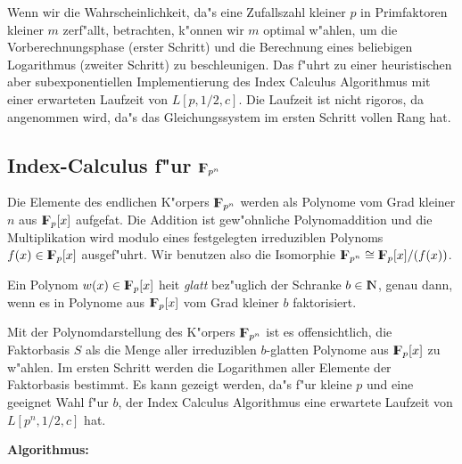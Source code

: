 Wenn wir die Wahrscheinlichkeit, da"s eine Zufallszahl kleiner $p$ in
Primfaktoren kleiner $m$ zerf"allt, betrachten, k"onnen wir $m$ optimal
w"ahlen, um die Vorberechnungsphase (erster Schritt) und die Berechnung
eines beliebigen Logarithmus (zweiter Schritt) zu beschleunigen. Das f"uhrt
zu einer heuristischen aber subexponentiellen Implementierung des 
Index Calculus Algorithmus mit einer erwarteten Laufzeit von
$L[p,1/2,c]$. Die Laufzeit ist nicht rigoros, da angenommen wird, da"s
das Gleichungssystem im ersten Schritt vollen Rang hat.

\subsection{Index-Calculus f"ur $\koerper{p^n}$}

Die Elemente des endlichen K"orpers $\koerper{p^n}$ werden als Polynome vom 
Grad kleiner $n$ aus $\koerper{p}[x]$ aufgefa\3t. Die Addition ist
gew"ohnliche Polynomaddition und die Multiplikation wird modulo eines
festgelegten irreduziblen Polynoms $f(x)\in\koerper{p}[x]$ ausgef"uhrt.
Wir benutzen also die Isomorphie $\koerper{p^n} \cong \koerper{p}[x]/(f(x))$.

\begin{definition}
  Ein Polynom $w(x)\in\koerper{p}[x]$ hei\3t {\em glatt} bez"uglich
  der Schranke $b\in\N$, genau dann, wenn es in Polynome aus 
  $\koerper{p}[x]$ vom Grad kleiner $b$ faktorisiert.
\end{definition}

Mit der Polynomdarstellung des K"orpers $\koerper{p^n}$ ist es offensichtlich,
die Faktorbasis $S$ als die Menge aller irreduziblen $b$-glatten Polynome aus 
$\koerper{p}[x]$ zu w"ahlen. Im ersten Schritt werden die Logarithmen aller Elemente
der Faktorbasis bestimmt. Es kann gezeigt werden, da"s f"ur kleine $p$ und eine
geeignet Wahl f"ur $b$, der Index Calculus Algorithmus eine erwartete
Laufzeit von $L[p^n,1/2,c]$ hat.

{\bf Algorithmus: }

